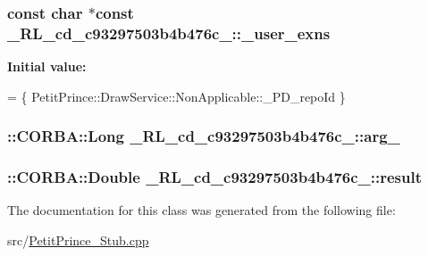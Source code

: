 \subsubsection[{\texorpdfstring{\+\_\+user\+\_\+exns}{_user_exns}}]{\setlength{\rightskip}{0pt plus 5cm}const char $\ast$const \+\_\+R\+L\+\_\+cd\+\_\+c93297503b4b476c\+\_\+::\+\_\+user\+\_\+exns\hspace{0.3cm}{\ttfamily [static]}}\hypertarget{class__0_r_l__cd__c93297503b4b476c__00000000_aed815b8e10305526569276393b2f0675}{}\label{class__0_r_l__cd__c93297503b4b476c__00000000_aed815b8e10305526569276393b2f0675}
{\bfseries Initial value\+:}
\begin{DoxyCode}
= \{
  PetitPrince::DrawService::NonApplicable::\_PD\_repoId
\}
\end{DoxyCode}
\subsubsection[{\texorpdfstring{arg\+\_\+0}{arg_0}}]{\setlength{\rightskip}{0pt plus 5cm}\+::C\+O\+R\+B\+A\+::\+Long \+\_\+R\+L\+\_\+cd\+\_\+c93297503b4b476c\+\_\+::arg\+\_}\hypertarget{class__0_r_l__cd__c93297503b4b476c__00000000_a9d70bde12d4e7bf6319ad0d2bd20a813}{}\label{class__0_r_l__cd__c93297503b4b476c__00000000_a9d70bde12d4e7bf6319ad0d2bd20a813}
\subsubsection[{\texorpdfstring{result}{result}}]{\setlength{\rightskip}{0pt plus 5cm}\+::C\+O\+R\+B\+A\+::\+Double \+\_\+R\+L\+\_\+cd\+\_\+c93297503b4b476c\+\_\+::result}\hypertarget{class__0_r_l__cd__c93297503b4b476c__00000000_a1f600d809c6391de305682594e9b03f7}{}\label{class__0_r_l__cd__c93297503b4b476c__00000000_a1f600d809c6391de305682594e9b03f7}


The documentation for this class was generated from the following file\+:\begin{DoxyCompactItemize}
\item 
src/\hyperlink{_petit_prince___stub_8cpp}{Petit\+Prince\+\_\+\+Stub.\+cpp}\end{DoxyCompactItemize}
